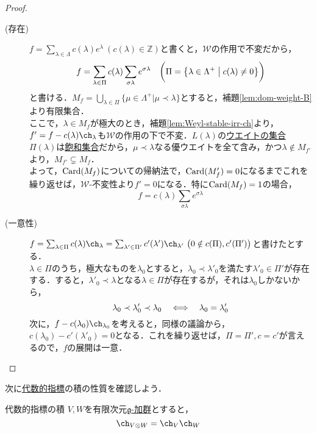 \documentclass[rep_main]{subfiles}
\begin{document}
\begin{proof}
	\begin{description}
		\item[(存在)] $f = \sum_{\lambda \in \Lambda} c(\lambda)e^\lambda\ (c(\lambda) \in \mathbb{Z})$と書くと，$\mathscr{W}$の作用で不変だから，
		\begin{equation}
			f = \sum_{\lambda \in \Pi} c(\lambda) \sum_{\sigma\lambda} e^{\sigma\lambda}\quad  \biggl(\Pi = \bigl\{\lambda \in \Lambda^+ \bigm| c(\lambda) \neq 0\bigr\}\biggr)
		\end{equation}
		と書ける．$M_f = \bigcup_{\lambda \in \Pi} \{\mu \in \Lambda^+ | \mu \prec \lambda\}$とすると，補題\ref{lem:dom-weight-B}より有限集合．\\
		ここで，$\lambda \in M_f$が極大のとき，補題\ref{lem:Weyl-stable-irr-ch}より，$f' = f - c(\lambda)\ch_\lambda$も$\mathscr{W}$の作用の下で不変．$L(\lambda)$の\hyperref[def:weight-rep]{ウエイトの集合}$\Pi(\lambda)$は\hyperref[def:weight-saturated]{飽和集合}だから，$\mu \prec \lambda$なる優ウエイトを全て含み，かつ$\lambda \notin M_{f'}$より，$M_{f'} \subsetneq M_f$．\\
		よって，$\operatorname{Card}(M_f)$についての帰納法で，$\operatorname{Card}(M_f') = 0$になるまでこれを繰り返せば，$\mathscr{W}$-不変性より$f' = 0$になる．特に$\operatorname{Card}(M_f) = 1$の場合，
		\begin{equation}
			f = c(\lambda) \sum_{\sigma\lambda} e^{\sigma\lambda}
		\end{equation}
		\item[(一意性)] $f = \sum_{\lambda \in \Pi} c(\lambda)\ch_\lambda = \sum_{\lambda' \in \Pi'} c'(\lambda')\ch_{\lambda'}\ \bigl(0 \notin c(\Pi), c'(\Pi')\bigr)$と書けたとする．\\
		$\lambda \in \Pi$のうち，極大なものを$\lambda_0$とすると，$\lambda_0 \prec \lambda'_0$を満たす$\lambda'_0 \in \Pi'$が存在する．すると，$\lambda'_0 \prec \lambda$となる$\lambda \in \Pi$が存在するが，それは$\lambda_0$しかないから，
		\begin{equation}
			\lambda_0 \prec \lambda'_0 \prec \lambda_0  \quad \Longleftrightarrow \quad  \lambda_0 = \lambda'_0
		\end{equation}
		次に，$f - c(\lambda_0)\ch_{\lambda_0}$を考えると，同様の議論から，$c(\lambda_0) - c'(\lambda'_0) = 0$となる．これを繰り返せば，$\Pi = \Pi', c = c'$が言えるので，$f$の展開は一意．
	\end{description}
\end{proof}
次に\hyperref[def:alg-character]{代数的指標}の積の性質を確認しよう．
\begin{myprop}[label=prop:alg-character-multiply]{代数的指標の積}
	$V, W$を有限次元\hyperref[ax:g-module]{$\mathfrak{g}$-加群}とすると，
	\begin{equation}
		\ch_{V \otimes W} = \ch_V\ch_W
	\end{equation}
\end{myprop}
\end{document}
